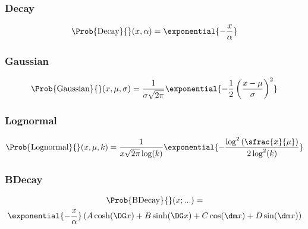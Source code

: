 \subsubsection{Decay}
\begin{equation}\label{sec:measurement_of_sin2beta:likelihood_fit:pdfs:decay}
  \Prob{\text{Decay}}{}(x, \alpha) = \exponential{- \frac{x}{\alpha}}
\end{equation}

\subsubsection{Gaussian}
\begin{equation}\label{sec:measurement_of_sin2beta:likelihood_fit:pdfs:gaussian}
  \Prob{\text{Gaussian}}{}(x, \mu, \sigma) = \frac{1}{\sigma\sqrt{2\pi}}\exponential{-\frac{1}{2} \left(\frac{x-\mu}{\sigma}\right)^2}
\end{equation}

\subsubsection{Lognormal}
\begin{equation}\label{sec:measurement_of_sin2beta:likelihood_fit:pdfs:lognormal}
  \Prob{\text{Lognormal}}{}(x, \mu, k) = \frac{1}{x \sqrt{2\pi} \log (k)} \exponential{-\frac{\log^2 \left(\sfrac{x}{\mu}\right)}{2 \log^2(k)}}
\end{equation}

\subsubsection{BDecay}
\begin{multline}\label{sec:measurement_of_sin2beta:likelihood_fit:pdfs:bdecay}
  \Prob{\text{BDecay}}{}(x;...) = \\ \exponential{- \frac{x}{\alpha}}\left( A \cosh (\DG x) + B \sinh (\DG x) + C \cos (\dm x) + D \sin (\dm x) \right)
\end{multline}

